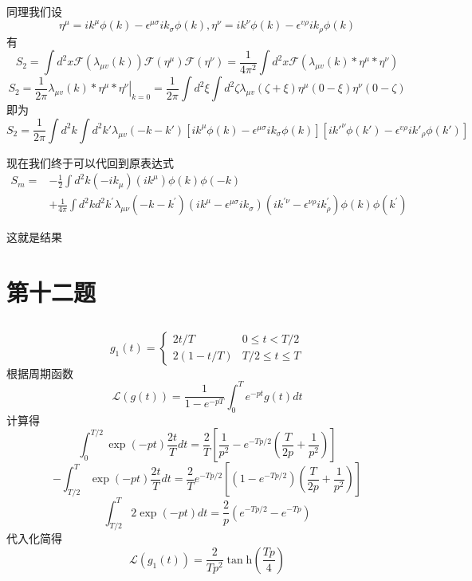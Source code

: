 \documentclass[a4paper]{ctexart}
\begin{document}
同理我们设
$$
    \eta ^{\mu}=ik^{\mu}\phi \left( k \right) -\epsilon ^{\mu \sigma}ik_{\sigma}\phi \left( k \right) ,\eta ^{\nu}=ik^{\nu}\phi \left( k \right) -\epsilon ^{v\rho}ik_{\rho}\phi \left( k \right)
$$
有
$$
    S_2=\int{d}^2x\mathcal{F}\left( \lambda _{\mu v}\left( k \right) \right) \mathcal{F}\left( \eta ^{\mu} \right) \mathcal{F}\left( \eta ^{\nu} \right) =\frac{1}{4\pi ^2}\int{d}^2x\mathcal{F}\left( \lambda _{\mu v}\left( k \right) *\eta ^{\mu}*\eta ^{\nu} \right)
$$
$$
    S_2=\frac{1}{2\pi}\left. \lambda _{\mu v}\left( k \right) *\eta ^{\mu}*\eta ^{\nu} \right|_{k=0}=\frac{1}{2\pi}\int{d}^2\xi \int{d}^2\zeta \lambda _{\mu v}\left( \zeta +\xi \right) \eta ^{\mu}\left( 0-\xi \right) \eta ^{\nu}\left( 0-\zeta \right)
$$
即为
$$
    S_2=\frac{1}{2\pi}\int{d}^2k\int{d}^2k'\lambda _{\mu v}\left( -k-k' \right) \left[ ik^{\mu}\phi \left( k \right) -\epsilon ^{\mu \sigma}ik_{\sigma}\phi \left( k \right) \right] \left[ i{k'}^{\nu}\phi \left( k' \right) -\epsilon ^{v\rho}i{k'}_{\rho}\phi \left( k' \right) \right]
$$

现在我们终于可以代回到原表达式
$$
    \begin{aligned}
        S_{m}
        = & -\frac{1}{2} \int d^{2} k\left(-i k_{\mu}\right)\left(i k^{\mu}\right) \phi(k) \phi(-k)                                                                                                                                                                      \\
          & +\frac{1}{4 \pi} \int d^{2} k d^{2} k^{\prime} \lambda_{\mu \nu}\left(-k-k^{\prime}\right)\left(i k^{\mu}-\epsilon^{\mu \sigma} i k_{\sigma}\right)\left(i k^{\prime \nu}-\epsilon^{\nu \rho} i k_{\rho}^{\prime}\right) \phi(k) \phi\left(k^{\prime}\right)
    \end{aligned}
$$

这就是结果

\section{第十二题}
\subsection{}
$$
    g_1(t)=\left\{\begin{array}{cc}
        2 t / T    & 0 \leq t<T / 2      \\
        2(1-t / T) & T / 2 \leq t \leq T
    \end{array}\right.
$$
根据周期函数
$$
    \mathcal{L}\left( g\left( t \right) \right) =
    \frac{1}{1-e^{-p T}} \int_{0}^{T} e^{-p t} g(t) d t
$$
计算得
$$
    \int_0^{T/2}{\exp \left( -pt \right) \frac{2t}{T}dt=\frac{2}{T}}\left[ \frac{1}{p^2}-e^{-Tp/2}\left( \frac{T}{2p}+\frac{1}{p^2} \right) \right]
$$
$$
    -\int_{T/2}^T{\exp \left( -pt \right) \frac{2t}{T}dt=\frac{2}{T}}e^{-Tp/2}\left[ \left( 1-e^{-Tp/2} \right) \left( \frac{T}{2p}+\frac{1}{p^2} \right) \right]
$$
$$
    \int_{T/2}^T{2\exp \left( -pt \right) dt=\frac{2}{p}}\left( e^{-Tp/2}-e^{-Tp} \right)
$$
代入化简得
$$
    \mathcal{L}\left( g_1\left( t \right) \right) =\frac{2}{Tp^2}\tan\text{h}\left( \frac{Tp}{4} \right)
$$
\end{document}
